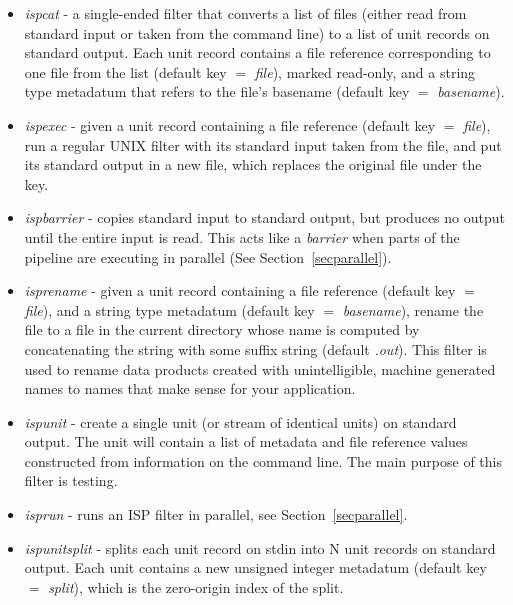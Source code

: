 \documentclass{article}
\begin{document}
\begin{itemize}
\item{{\em ispcat} - a single-ended filter that converts a list of files 
	(either read from standard input or taken from the command line) to
 	a list of unit records on standard output.  
	Each unit record contains a file reference
	corresponding to one file from the list (default key $=$ {\em file}),
	marked read-only, and a string type metadatum 
	that refers to the file's basename (default key $=$ {\em basename}).}

\item{{\em ispexec} - given a unit record containing a file reference
	(default key $=$ {\em file}),
	run a regular UNIX filter with its standard input taken from the file,
	and put its standard output in a new file, which replaces the original
	file under the key.}

\item{{\em ispbarrier} - copies standard input to standard output, but produces
	no output until the entire input is read.  This acts like a 
	{\em barrier} when parts of the pipeline are executing in parallel
	(See Section~\ref{secparallel}).}

\item{{\em isprename} - given a unit record containing a file reference
	(default key $=$ {\em file}), and a string type metadatum
	(default key $=$ {\em basename}), rename the file 
	to a file in the current directory whose name is computed by 
	concatenating the string with some suffix string (default {\em .out}).
	This filter is used to rename data products created with unintelligible,
	machine generated names to names that make sense for your application.}

\item{{\em ispunit} - create a single unit (or stream of identical units)
	on standard output.  The unit will contain a list of metadata and 
	file reference values constructed from information on the command 
	line.  The main purpose of this filter is testing.}

\item{{\em isprun} - runs an ISP filter in parallel, see 
	Section~\ref{secparallel}.}

\item{{\em ispunitsplit} - splits each unit record on stdin into N unit
	records on standard output.  Each unit contains a new unsigned integer
	metadatum (default key $=$ {\em split}), which is the zero-origin
	index of the split.}


\end{itemize}
\end{document}
